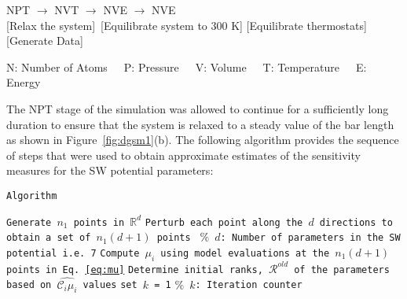 \begin{center}

NPT \hspace{5mm} $\rightarrow$ \hspace{5mm} NVT \hspace{5mm} $\rightarrow$ \hspace{5mm} NVE \hspace{5mm}
$\rightarrow$ \hspace{5mm} NVE
\\ \vspace{1mm}
\tiny [Relax the system]~[Equilibrate system to 300 K] \hspace{1mm} [Equilibrate thermostats] \hspace{4mm}
 [Generate Data]
\\ \vspace{1mm}

\tiny{N: Number of Atoms~~~P: Pressure~~~V: Volume~~~T: Temperature~~~E: Energy}
\end{center}

\noindent The NPT stage of the simulation was allowed to continue for a sufficiently long duration to ensure
that the system is relaxed to a steady value of the bar length as shown in Figure~\ref{fig:dgsm1}(b).
The following algorithm provides the sequence of steps that were used to obtain approximate estimates of the
sensitivity measures for the SW potential parameters:
\bigskip

\texttt{Algorithm}

\begin{algorithm}[H]
\SetAlgoLined
\texttt{Generate $n_1$ points in $\mathbb{R}^{d}$}\;
\texttt{Perturb each point along the $d$ directions to obtain a set of $n_1(d+1)$ points}
\texttt{\color{blue} $\%$~$d$: Number of parameters in the SW potential i.e. 7}\;
\texttt{Compute $\mu_i$ using model evaluations at the $n_1(d+1)$ points in Eq.~\ref{eq:mu}}\;
\texttt{Determine initial ranks, $\mathcal{R}^{old}$ of the parameters based on $\hat{\mathcal{C}_i\mu_i}$ values}\;
\texttt{set $k$ = 1}
\texttt{\color{blue}$\%$~$k$:~Iteration counter}\;
\end{algorithm}

